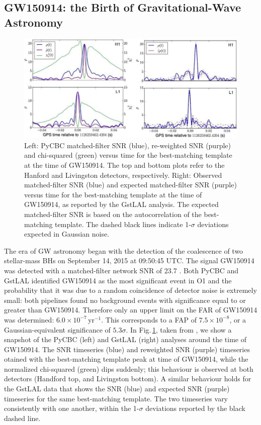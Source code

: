 \documentclass[binding=0.6cm, LaM]{sapthesis}
\begin{document}
\subsection{GW150914: the Birth of Gravitational-Wave Astronomy}

		\begin{figure}[!t]
                	\label{firstgw}
                	\includegraphics[scale=0.45]{firstgw}
                	\centering
                	\caption{Left: PyCBC matched-filter SNR (blue), re-weighted SNR (purple) and chi-squared (green) versus time for the best-matching template at the time of GW150914. The top and bottom plots refer to the Hanford and Livingston detectors, respectively. Right: Observed matched-filter SNR (blue) and expected matched-filter SNR (purple) versus time for the best-matching template at the time of GW150914, as reported by the GstLAL analysis. The expected matched-filter SNR is based on the autocorrelation of the best-matching template. The dashed black lines indicate 1-$\sigma$ deviations expected in Gaussian noise. \cite{21}} 
                	\label{fig:firstgw}
                \end{figure}

	The era of GW astronomy began with the detection of the coalescence of two stellar-mass BHs
	on September 14, 2015 at 09:50:45 UTC.  The signal GW150914 was detected with a matched-filter network SNR of 23.7 \cite{21}. 
	Both PyCBC and GstLAL identified GW150914 as the most significant event in O1 and the probability that 
	it was due to a random coincidence of detector noise is extremely small: 
	both pipelines found no background events with significance 
	equal to or greater than GW150914.  Therefore only an upper limit on the FAR of GW150914 was determined: $6.0 \times 10^{-7}\,$yr$^{-1}$. 
	This corresponds to a FAP of $7.5\times10^{-8}$, or a Gaussian-equivalent significance of $5.3\sigma$.  In Fig.\,\ref{fig:firstgw}, taken from \cite{21}, we show a snapshot of the PyCBC (left) and GstLAL (right) analyses around the time of GW150914.  The SNR timeseries (blue) and reweighted SNR (purple) timeseries otained with the best-matching template peak at time of GW150914, while the normalized chi-squared (green) dips suddenly; this behaviour is observed at both detectors (Handford top, and Livingston bottom).  A similar behaviour holds for the GstLAL data that shows the SNR (blue) and expected SNR (purple) timeseries for the same best-matching template.  The two timeseries vary consistently with one another, within the 1-$\sigma$ deviations reported by the black dashed line.
\end{document}
